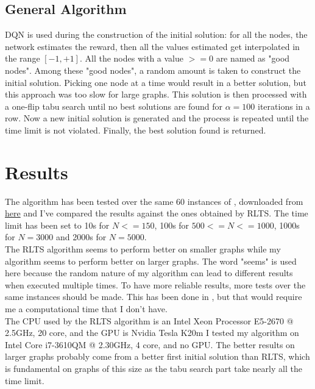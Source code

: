 \documentclass{article}
\begin{document}
\subsection{General Algorithm}
DQN is used during the construction of the initial solution:
for all the nodes, the network estimates the reward, then all the values
estimated get interpolated in the range $[-1,+1]$. All the nodes with a value
$>= 0$ are named as "good nodes". Among these "good nodes", a random amount is
taken to construct the initial solution. Picking one node at a time would result
in a better solution, but this approach was too slow for large graphs. This
solution is then processed with a one-flip tabu search until no best solutions are
found for $\alpha = 100$ iterations in a row.  Now a new initial solution is
generated and the process is repeated until the time limit is not
violated. Finally, the best solution found is returned.

\section{Results}
The algorithm has been tested over the same 60 instances of
\cite{nijimbere2020tabu}, downloaded from
\href{http://grafo.etsii.urjc.es/optsicom/edp/}{here} and I've compared the
results against the ones obtained by RLTS. The time limit has been set to 10s
for $N <= 150$, 100s for $500 <= N <= 1000$, 1000s for $N = 3000$ and 2000s for
$N = 5000$.\\
The RLTS algorithm seems to perform better on smaller graphs while my algorithm
seems to perform better on larger graphs. The word "seems" is used here because
the random nature of my algorithm can lead to different results when executed
multiple times. To have more reliable results, more tests over the same
instances should be made. This has been done in \cite{nijimbere2020tabu}, but
that would require me a computational time that I don't have.\\
The CPU used by the RLTS algorithm is an Intel Xeon Processor E5-2670 @ 2.5GHz, 20 core, and the GPU is Nvidia Tesla K20m
I tested my algorithm on Intel Core i7-3610QM @ 2.30GHz, 4 core, and no GPU.
The better results on larger graphs probably come from a better first initial solution
than RLTS, which is fundamental on graphs of this size as the tabu search part
take nearly all the time limit.\\





\end{document}
